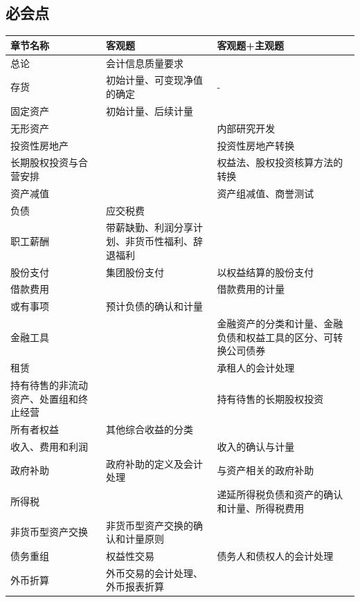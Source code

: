 \documentclass[UTF8,12pt]{ctexart}
\numberwithin{equation}{section} %
\numberwithin{figure}{section}
\numberwithin{table}{section}
\begin{document}
	\subsection{必会点}
	\begin{table}
		\centering
		\begin{tabularx}{\textwidth}{|X|X|X|} 
			\hline
			章节名称& 客观题 & 客观题+主观题  \\ 
			\hline
			总论& 会计信息质量要求 &   \\ 
			\hline
			存货& 初始计量、可变现净值的确定 & -  \\ 
			\hline
			固定资产& 初始计量、后续计量 &   \\ 
			\hline
			无形资产&  & 内部研究开发  \\ 
			\hline
			投资性房地产&  & 投资性房地产转换  \\ 
			\hline
			长期股权投资与合营安排&  & 权益法、股权投资核算方法的转换  \\ 
			\hline
			资产减值&  & 资产组减值、商誉测试  \\ 
			\hline
			负债& 应交税费 &   \\ 
			\hline
			职工薪酬& 带薪缺勤、利润分享计划、非货币性福利、辞退福利 &   \\ 
			\hline
			股份支付& 集团股份支付 & 以权益结算的股份支付  \\ 
			\hline
			借款费用&  & 借款费用的计量  \\
			\hline
			或有事项& 预计负债的确认和计量 &   \\
			\hline
			金融工具&  & 金融资产的分类和计量、金融负债和权益工具的区分、可转换公司债券  \\
			\hline
			租赁&  & 承租人的会计处理  \\
			\hline
			持有待售的非流动资产、处置组和终止经营&  & 持有待售的长期股权投资  \\
			\hline
			所有者权益& 其他综合收益的分类 &   \\
			\hline
			收入、费用和利润&  & 收入的确认与计量  \\
			\hline
			政府补助& 政府补助的定义及会计处理 & 与资产相关的政府补助  \\
			\hline
			所得税&  & 递延所得税负债和资产的确认和计量、所得税费用  \\
			\hline
			非货币型资产交换& 非货币型资产交换的确认和计量原则 &   \\
			\hline
			债务重组& 权益性交易 & 债务人和债权人的会计处理  \\
			\hline
			外币折算& 外币交易的会计处理、外币报表折算 &   \\

\end{tabularx}
\end{table}
\end{document}
